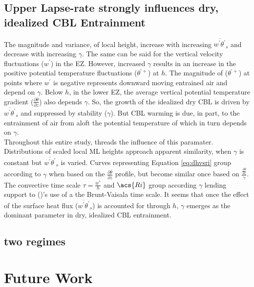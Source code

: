 \subsection{Upper Lapse-rate strongly influences dry, idealized \acs{CBL} Entrainment}

The magnitude and variance, of local height, increase with increasing $\overline{w^{'}\theta^{'}}_{s}$ and decrease with increasing $\gamma$.  The same can be said for the vertical velocity fluctuations ($w^{'}$) in the \acs{EZ}.  However, increased $\gamma$ results in an increase in the positive potential temperature fluctuations ($\theta^{'+}$) at $h$. The magnitude of ($\theta^{'+}$) at points where $w^{'}$ is negative represents downward moving entrained air and depend on $\gamma$.  Below $h$, in the lower \acs{EZ}, the average vertical potential temperature gradient ($\frac{\partial \overline{\theta}}{\partial z}$) also depends $\gamma$. So, the growth of the idealized dry \acs{CBL} is driven by $\overline{w^{'}\theta^{'}}_{s}$ and suppressed by stability ($\gamma$). But \acs{CBL} warming is due, in part, to the entrainment of air from aloft the potential temperature of which in turn depends on $\gamma$.\\

Throughout this entire study, threads the influence of this paramater.  Distributions of scaled local \acs{ML} heights approach apparent similarity, when $\gamma$ is constant but $\overline{w^{'}\theta^{'}}_{s}$ is varied.  Curves representing Equation \ref{eq:dhvsri} group according to $\gamma$ when based on the $\frac{\partial \overline{\theta}}{\partial z}$ profile, but become similar once based on $\frac{\frac{\partial \overline{\theta}}{\partial z}}{\gamma}$.  The convective time scale $\tau = \frac{w^{*}}{h}$ and $\acs{Ri}$ group according $\gamma$ lending support to \citeauthor{FedConzMir04} (\citeyear{FedConzMir04})'s use of a the Brunt-Vaisala time scale.  It seems that once the effect of the surface heat flux ($\overline{w^{'}\theta^{'}}_{s}$) is accounted for through $h$, $\gamma$ emerges as the dominant parameter in dry, idealized \acs{CBL} entrainment.\\ 

\subsection{two regimes}

\section{Future Work}

